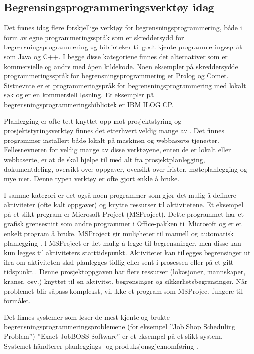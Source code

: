 \subsection{Begrensingsprogrammeringsverktøy idag}
Det finnes idag flere forskjellige verktøy for begrensningsprogrammering, både i form av egne programmeringsspråk som er skreddersydd for begrensningsprogrammering og biblioteker til godt kjente programmeringsspråk som Java og C++. I begge disse kategoriene finnes det alternativer som er kommersielle og andre med åpen kildekode. Noen eksempler på skreddersydde programmeringsspråk for begrensningsprogrammering er Prolog og Comet. Sistnevnte er et programmeringspråk for begrensningsprogrammering med lokalt søk og er en kommersiell løsning. Et eksempler på begrensningsprogrammeringsbibliotek er IBM ILOG CP.

Planlegging er ofte tett knyttet opp mot prosjektstyring og prosjektstyringsverktøy finnes det etterhvert veldig mange av \cite{projectmanagmenttoolswiki}. Det finnes programmer installert både lokalt på maskinen og webbaserte tjenester. Fellesnevneren for veldig mange av disse verktøyene, enten de er lokalt eller webbaserte, er at de skal hjelpe til med alt fra prosjektplanlegging, dokumentdeling, oversikt over oppgaver, oversikt over frister, møteplanlegging og mye mer. Denne typen verktøy er ofte gjort enkle å bruke.

I samme kategori er det også noen programmer som gjør det mulig å definere aktiviteter (ofte kalt oppgaver) og knytte ressurser til aktivitetene. Et eksempel på et slikt program er Microsoft Project (MSProject). Dette programmet har et grafisk grensesnitt som andre programmer i Office-pakken til Microsoft og er et enkelt program å bruke. MSProject gir muligheter til manuell og automatisk planlegging \cite{msproject2010blog}. I MSProject er det mulig å legge til begrensninger, men disse kan kun legges til aktiviteters starttidspunkt. Aktiviteter kan tillegges begrensinger ut ifra om aktiviteten skal planlegges tidlig eller sent i prosessen eller på et gitt tidspunkt \cite{begrensingermsproject}. Denne prosjektoppgaven har flere ressurser (lokasjoner, mannskaper, kraner, osv.) knyttet til en aktivitet, begrensinger og sikkerhetsbegrensinger. Når problemet blir såpass komplekst, vil ikke et program som MSProject fungere til formålet.

Det finnes systemer som løser de mest kjente og brukte begrensningsprogrammeringsproblemene (for eksempel ''Job Shop Scheduling Problem'')  ''Exact JobBOSS Software'' er et eksempel på et slikt system. Systemet håndterer planleggings- og produksjonsgjennomføring \cite{exact}.

